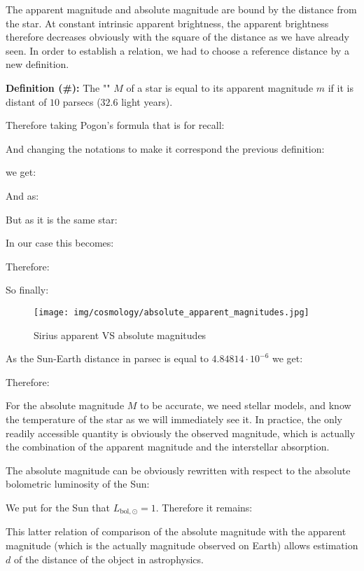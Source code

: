 	The apparent magnitude and absolute magnitude are bound by the distance from the star. At constant intrinsic apparent brightness, the apparent brightness therefore decreases obviously with the square of the distance as we have already seen. In order to establish a relation, we had to choose a reference distance by a new definition.

	\textbf{Definition (\#\mydef):} The "" $M$ of a star is equal to its apparent magnitude $m$ if it is distant of $10$ parsecs ($32.6$ light years).
	
	Therefore taking Pogon's formula that is for recall:
	
	And changing the notations to make it correspond the previous definition:
	
	we get:
	
	And as:
	
	But as it is the same star:
	
	In our case this becomes:
	
	Therefore:
	
	So finally:
	
	\begin{figure}[H]
		\begin{center}
		\texttt{[image: img/cosmology/absolute\_apparent\_magnitudes.jpg]}
		\end{center}	
		\caption{Sirius apparent VS absolute magnitudes}
	\end{figure}
	As the Sun-Earth distance in parsec is equal to $4.84814\cdot 10^{-6}$  we get:
	
	Therefore:
	
	\begin{tcolorbox}[title=Remark,colframe=black,arc=10pt]
	For the absolute magnitude $M$ to be accurate, we need stellar models, and know the temperature of the star as we will immediately see it. In practice, the only readily accessible quantity is obviously the observed magnitude, which is actually the combination of the apparent magnitude and the interstellar absorption.
	\end{tcolorbox}
	The absolute magnitude can be obviously rewritten with respect to the absolute bolometric luminosity of the Sun:	
	
	We put for the Sun that $L_{\text{bol},\odot}=1$. Therefore it remains:
	
	
	This latter relation of comparison of the absolute magnitude with the apparent magnitude (which is the actually magnitude observed on Earth) allows estimation $d$ of the distance of the object in astrophysics.
	
